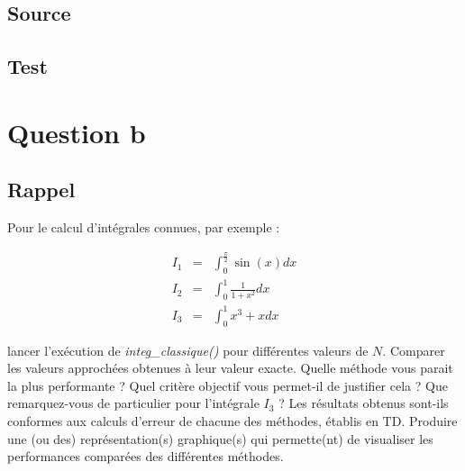 \documentclass[a4paper,10pt]{report}
\begin{document}
\subsection*{Source}

\begin{center}
	
	
	
	
	
\end{center}

\subsection*{Test}


\section*{Question b}

\subsection*{Rappel}

Pour le calcul d’intégrales connues, par exemple :

\begin{eqnarray}
I_1 &=& \int_{0}^{\frac{\pi}{2}}\sin(x)dx\\
I_2 &=& \int_{0}^{1}\frac{1}{1 + x^2}dx\\
I_3 &=& \int_{0}^{1}x^3 + xdx
\end{eqnarray}

lancer l’exécution de \textit{integ\_classique()} pour différentes valeurs de $N$.
Comparer les valeurs approchées obtenues à leur valeur exacte. Quelle méthode vous parait la plus performante ? Quel critère objectif vous permet-il de justifier cela ? Que remarquez-vous de particulier pour l’intégrale $I_3$ ? Les résultats obtenus sont-ils conformes aux calculs d’erreur de chacune des méthodes, établis en TD.
Produire une (ou des) représentation(s) graphique(s) qui permette(nt) de visualiser les performances comparées des différentes méthodes.
\end{document}
